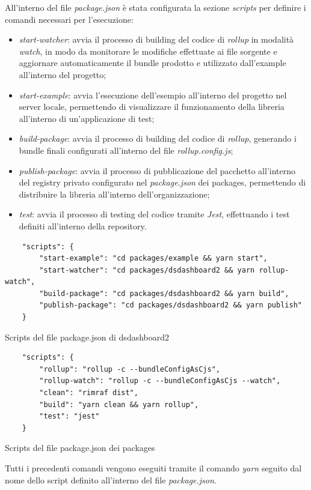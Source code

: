 All'interno del file \textit{package.json} è stata configurata la sezione \textit{scripts} per definire i comandi necessari per l'esecuzione:
\begin{itemize}
    \item \textit{start-watcher}: avvia il processo di building del codice di \textit{rollup} in modalità \textit{watch}, in modo da monitorare le modifiche effettuate
          ai file sorgente e aggiornare automaticamente il bundle prodotto e utilizzato dall'example all'interno del progetto;
    \item \textit{start-example}: avvia l'esecuzione dell'esempio all'interno del progetto nel server locale, permettendo di visualizzare il funzionamento della libreria
          all'interno di un'applicazione di test;
    \item \textit{build-package}: avvia il processo di building del codice di \textit{rollup}, generando i bundle finali configurati all'interno del file \textit{rollup.config.js};
    \item \textit{publish-package}: avvia il processo di pubblicazione del pacchetto all'interno del registry privato configurato nel \textit{package.json} dei packages, permettendo
          di distribuire la libreria all'interno dell'organizzazione;
    \item \textit{test}: avvia il processo di testing del codice tramite \textit{Jest}, effettuando i test definiti all'interno della repository.
\end{itemize}
\begin{listing}[H]
    \begin{verbatim}
    "scripts": {
        "start-example": "cd packages/example && yarn start",
        "start-watcher": "cd packages/dsdashboard2 && yarn rollup-watch",
        "build-package": "cd packages/dsdashboard2 && yarn build",
        "publish-package": "cd packages/dsdashboard2 && yarn publish"
    }
    \end{verbatim}
    \caption{Scripts del file package.json di dsdashboard2}
    \label{listing:scripts_package_json_dsdashboard2}
\end{listing}

\begin{listing}[H]
    \begin{verbatim}
    "scripts": {
        "rollup": "rollup -c --bundleConfigAsCjs",
        "rollup-watch": "rollup -c --bundleConfigAsCjs --watch",
        "clean": "rimraf dist",
        "build": "yarn clean && yarn rollup",
        "test": "jest"
    }
    \end{verbatim}
    \caption{Scripts del file package.json dei packages}
    \label{listing:scripts_package_json_packages}
\end{listing}
Tutti i precedenti comandi vengono eseguiti tramite il comando \textit{yarn} seguito dal nome dello script definito all'interno del file \textit{package.json}.

